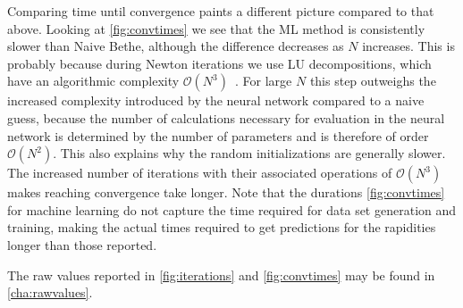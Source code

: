 \documentclass[11pt, a4paper]{report} %
\begin{document}
Comparing time until convergence paints a different picture compared to that above.
Looking at \cref{fig:convtimes} we see that the ML method is consistently slower than Naive Bethe, although the difference decreases as \(N\) increases.
This is probably because during Newton iterations we use LU decompositions, which have an algorithmic complexity \(\mathcal{O}(N^3)\)~\cite{Press2007}.
For large \(N\) this step outweighs the increased complexity introduced by the neural network compared to a naive guess, because the number of calculations necessary for evaluation in the neural network is determined by the number of parameters and is therefore of order \(\mathcal{O}(N^2)\).
This also explains why the random initializations are generally slower. 
The increased number of iterations with their associated operations of \(\mathcal{O}(N^3)\) makes reaching convergence take longer.
Note that the durations \cref{fig:convtimes} for machine learning do not capture the time required for data set generation and training, making the actual times required to get predictions for the rapidities longer than those reported.

The raw values reported in \cref{fig:iterations} and \cref{fig:convtimes} may be found in \cref{cha:rawvalues}.
\end{document}

